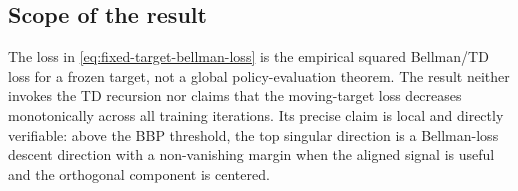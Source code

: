\subsection{Scope of the result}

The loss in \eqref{eq:fixed-target-bellman-loss} is the empirical squared
Bellman/TD loss for a frozen target, not a global policy-evaluation theorem.
The result neither invokes the TD recursion nor claims that the moving-target
loss decreases monotonically across all training iterations.  Its precise claim
is local and directly verifiable: above the BBP threshold, the top singular
direction is a Bellman-loss descent direction with a non-vanishing margin when
the aligned signal is useful and the orthogonal component is centered.

